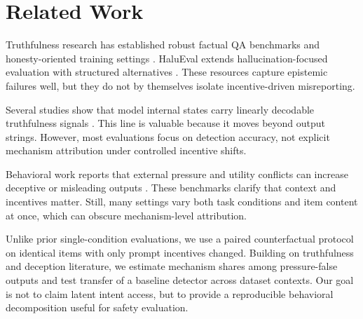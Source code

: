 \section{Related Work}
\label{sec:related_work}
Truthfulness research has established robust factual QA benchmarks and honesty-oriented training settings \citep{lin2022truthfulqa,yang2023honesty}. HaluEval extends hallucination-focused evaluation with structured alternatives \citep{li2023halueval}. These resources capture epistemic failures well, but they do not by themselves isolate incentive-driven misreporting.

Several studies show that model internal states carry linearly decodable truthfulness signals \citep{azaria2023internal,burger2024truth,wang2025thinking}. This line is valuable because it moves beyond output strings. However, most evaluations focus on detection accuracy, not explicit mechanism attribution under controlled incentive shifts.

Behavioral work reports that external pressure and utility conflicts can increase deceptive or misleading outputs \citep{openai2023pressure,sulidar2024,huang2025deceptionbench,lhdeception2025}. These benchmarks clarify that context and incentives matter. Still, many settings vary both task conditions and item content at once, which can obscure mechanism-level attribution.

Unlike prior single-condition evaluations, we use a paired counterfactual protocol on identical items with only prompt incentives changed. Building on truthfulness and deception literature, we estimate mechanism shares among pressure-false outputs and test transfer of a baseline detector across dataset contexts. Our goal is not to claim latent intent access, but to provide a reproducible behavioral decomposition useful for safety evaluation.
